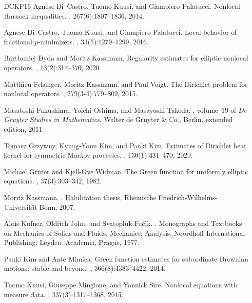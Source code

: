\documentclass[reqno]{amsart}
\theoremstyle{plain}
\theoremstyle{definition}
\numberwithin{equation}{section}
\begin{document}
\begin{thebibliography}{DCKP16}
	Agnese Di~Castro, Tuomo Kuusi, and Giampiero Palatucci.
	\newblock Nonlocal {H}arnack inequalities.
	, 267(6):1807--1836, 2014.
	
	Agnese Di~Castro, Tuomo Kuusi, and Giampiero Palatucci.
	\newblock Local behavior of fractional {$p$}-minimizers.
	,
	33(5):1279--1299, 2016.
	
	Bart{\l}omiej Dyda and Moritz Kassmann.
	\newblock Regularity estimates for elliptic nonlocal operators.
	, 13(2):317--370, 2020.
	
	Matthieu Felsinger, Moritz Kassmann, and Paul Voigt.
	\newblock The {D}irichlet problem for nonlocal operators.
	, 279(3-4):779--809, 2015.
	
	Masatoshi Fukushima, Yoichi Oshima, and Masayoshi Takeda.
	, volume~19 of
	{\em De Gruyter Studies in Mathematics}.
	\newblock Walter de Gruyter \& Co., Berlin, extended edition, 2011.
	
	Tomasz Grzywny, Kyung-Youn Kim, and Panki Kim.
	\newblock Estimates of {D}irichlet heat kernel for symmetric {M}arkov
	processes.
	, 130(1):431--470, 2020.
	
	Michael Gr\"{u}ter and Kjell-Ove Widman.
	\newblock The {G}reen function for uniformly elliptic equations.
	, 37(3):303--342, 1982.
	
	Moritz Kassmann.
	.
	\newblock Habilitation thesis, Rheinische Friedrich-Wilhelms-Universit\"{a}t
	Bonn, 2007.
	
	Alois Kufner, Old\v{r}ich John, and Svatopluk Fu\v{c}\'{\i}k.
	.
	\newblock Monographs and Textbooks on Mechanics of Solids and Fluids,
	Mechanics: Analysis. Noordhoff International Publishing, Leyden; Academia,
	Prague, 1977.
	
	Panki Kim and Ante Mimica.
	\newblock Green function estimates for subordinate {B}rownian motions: stable
	and beyond.
	, 366(8):4383--4422, 2014.
	
	Tuomo Kuusi, Giuseppe Mingione, and Yannick Sire.
	\newblock Nonlocal equations with measure data.
	, 337(3):1317--1368, 2015.
	

\end{thebibliography}
\end{document}
